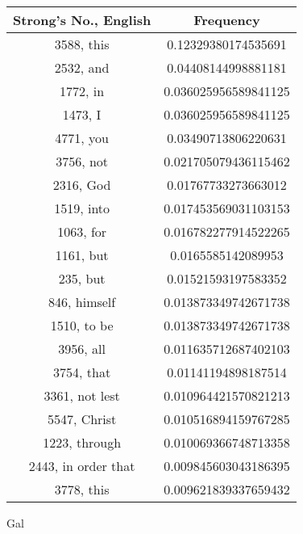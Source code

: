 \documentclass[12pt,letterpaper]{article}
\begin{document}
 \begin{longtable}{|c|c|}
\hline
 Strong's No., English & Frequency \\ \hline  
3588, this & 0.12329380174535691\\ \hline 
 2532, and & 0.04408144998881181\\ \hline 
 1772, in & 0.036025956589841125\\ \hline 
 1473, I & 0.036025956589841125\\ \hline 
 4771, you & 0.03490713806220631\\ \hline 
 3756, not & 0.021705079436115462\\ \hline 
 2316, God & 0.01767733273663012\\ \hline 
 1519, into & 0.017453569031103153\\ \hline 
 1063, for & 0.016782277914522265\\ \hline 
 1161, but & 0.0165585142089953\\ \hline 
 235, but & 0.01521593197583352\\ \hline 
 846, himself & 0.013873349742671738\\ \hline 
 1510, to be & 0.013873349742671738\\ \hline 
 3956, all & 0.011635712687402103\\ \hline 
 3754, that & 0.01141194898187514\\ \hline 
 3361, not lest & 0.010964421570821213\\ \hline 
 5547, Christ & 0.010516894159767285\\ \hline 
 1223, through & 0.010069366748713358\\ \hline 
 2443, in order that & 0.009845603043186395\\ \hline 
 3778, this & 0.009621839337659432\\ \hline 
\end{longtable} 
 

Gal
\end{document}
